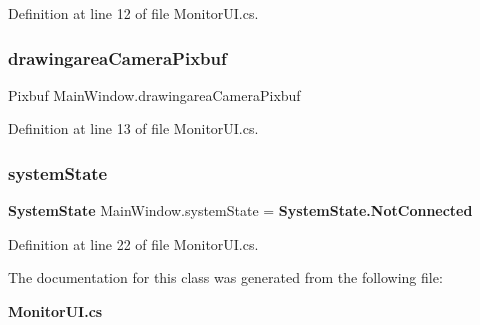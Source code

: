 Definition at line 12 of file Monitor\+U\+I.\+cs.

\mbox{\label{class_main_window_a41581e449b18e87acbdff5baa12c2050}} 
\subsubsection{drawingarea\+Camera\+Pixbuf}
{\footnotesize\ttfamily Pixbuf Main\+Window.\+drawingarea\+Camera\+Pixbuf\hspace{0.3cm}{\ttfamily [private]}}



Definition at line 13 of file Monitor\+U\+I.\+cs.

\mbox{\label{class_main_window_a105025ee1bdfac188f1ce640d593550d}} 
\subsubsection{system\+State}
{\footnotesize\ttfamily \textbf{ System\+State} Main\+Window.\+system\+State = \textbf{ System\+State.\+Not\+Connected}\hspace{0.3cm}{\ttfamily [private]}}



Definition at line 22 of file Monitor\+U\+I.\+cs.



The documentation for this class was generated from the following file\+:\begin{DoxyCompactItemize}
\item 
\textbf{ Monitor\+U\+I.\+cs}\end{DoxyCompactItemize}
